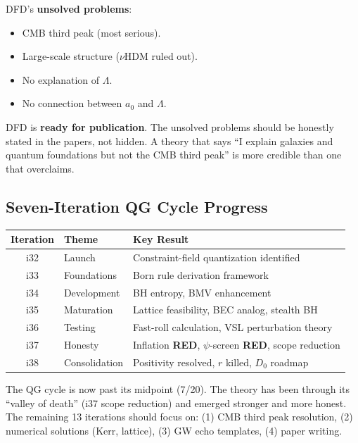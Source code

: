 \documentclass[11pt,a4paper]{article}
\newcommand{\RED}{\textcolor{dfdred}{\textbf{RED}}}
\begin{document}
DFD's \textbf{unsolved problems}:
\begin{itemize}
\item CMB third peak (most serious).
\item Large-scale structure ($\nu$HDM ruled out).
\item No explanation of $\Lambda$.
\item No connection between $a_0$ and $\Lambda$.
\end{itemize}

DFD is \textbf{ready for publication}. The unsolved problems should be honestly stated in the papers, not hidden. A theory that says ``I explain galaxies and quantum foundations but not the CMB third peak'' is more credible than one that overclaims.

\subsection{Seven-Iteration QG Cycle Progress}

\begin{center}
\begin{tabular}{clp{8cm}}
\toprule
\textbf{Iteration} & \textbf{Theme} & \textbf{Key Result} \\
\midrule
i32 & Launch & Constraint-field quantization identified \\
i33 & Foundations & Born rule derivation framework \\
i34 & Development & BH entropy, BMV enhancement \\
i35 & Maturation & Lattice feasibility, BEC analog, stealth BH \\
i36 & Testing & Fast-roll calculation, VSL perturbation theory \\
i37 & Honesty & Inflation \RED, $\psi$-screen \RED, scope reduction \\
i38 & Consolidation & Positivity resolved, $r$ killed, $D_0$ roadmap \\
\bottomrule
\end{tabular}
\end{center}

The QG cycle is now past its midpoint (7/20). The theory has been through its ``valley of death'' (i37 scope reduction) and emerged stronger and more honest. The remaining 13 iterations should focus on: (1) CMB third peak resolution, (2) numerical solutions (Kerr, lattice), (3) GW echo templates, (4) paper writing.
\end{document}
